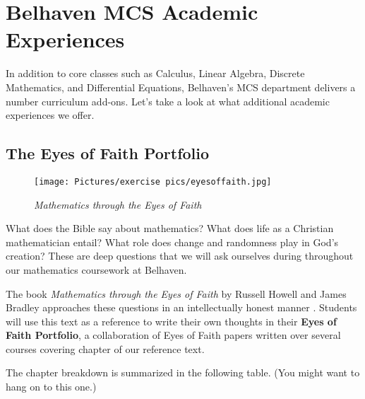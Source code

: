 
\section{Belhaven MCS Academic Experiences}

In addition to core classes such as Calculus, Linear Algebra, Discrete Mathematics, and Differential Equations, Belhaven's MCS department delivers a number curriculum add-ons. Let's take a look at what additional academic experiences we offer.

\subsection{The Eyes of Faith Portfolio}

\begin{figure}[h]
    \centering
    \texttt{[image: Pictures/exercise pics/eyesoffaith.jpg]}
    \label{eyesoffaith}
    \caption{\emph{Mathematics through the Eyes of Faith}}
\end{figure}

\noindent What does the Bible say about mathematics? What does life as a Christian mathematician entail? What role does change and randomness play in God's creation? These are deep questions that we will ask ourselves during throughout our mathematics coursework at Belhaven.

\noindent The book \emph{Mathematics through the Eyes of Faith} by Russell Howell and James Bradley approaches these questions in an intellectually honest manner \cite{eyesoffaith}. Students will use this text as a reference to write their own thoughts in their \textbf{Eyes of Faith Portfolio}, a collaboration of Eyes of Faith papers written over several courses covering chapter of our reference text.

\noindent The chapter breakdown is summarized in the following table. (You might want to hang on to this one.)

